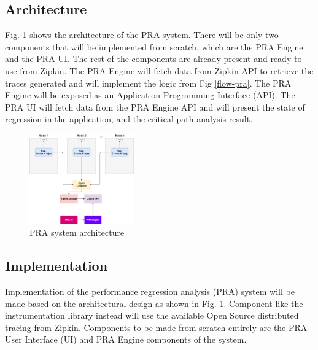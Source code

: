\documentclass[conference]{configs/IEEEtran}
\begin{document}
\subsection{Architecture}
Fig. \ref{arch-pra} shows the architecture of the PRA system. There will be only two components that will be implemented from scratch, which are the PRA Engine and the PRA UI. The rest of the components are already present and ready to use from Zipkin. The PRA Engine will fetch data from Zipkin API to retrieve the traces generated and will implement the logic from Fig \ref{flow-pra}. The PRA Engine will be exposed as an Application Programming Interface (API). The PRA UI will fetch data from the PRA Engine API and will present the state of regression in the application, and the critical path analysis result.
\begin{figure}[!htb]
	\centering
	\includegraphics[width=0.4\textwidth]{resources/ch3/arch.png}
	\caption{PRA system architecture}
	\label{arch-pra}
\end{figure}

\subsection{Implementation}
Implementation of the performance regression analysis (PRA) system will be made based on the architectural design as shown in Fig. \ref{arch-pra}. Component
like the instrumentation library instead will use the available
Open Source distributed tracing from Zipkin. Components to be made from scratch entirely are the PRA User Interface (UI) and PRA Engine components of the system.
\end{document}
